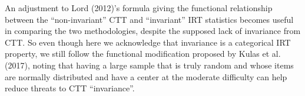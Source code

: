 \documentclass[
  man]{apa6}
\begin{document}
An adjustment to Lord (2012)'s formula giving the functional relationship between the ``non-invariant'' CTT and ``invariant'' IRT statistics becomes useful in comparing the two methodologies, despite the supposed lack of invariance from CTT. So even though here we acknowledge that invariance is a categorical IRT property, we still follow the functional modification proposed by Kulas et al. (2017), noting that having a large sample that is truly random and whose items are normally distributed and have a center at the moderate difficulty can help reduce threats to CTT ``invariance''.
\end{document}
